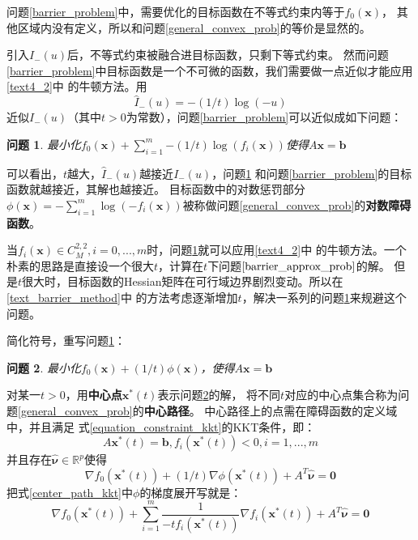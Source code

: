 \documentclass{article}
\newtheorem{problem}{问题}
\begin{document}
问题\ref{barrier_problem}中，需要优化的目标函数在不等式约束内等于$f_0(\bm x)$，
其他区域内没有定义，所以和问题\ref{general_convex_prob}的等价是显然的。

引入$I_-(u)$后，不等式约束被融合进目标函数，只剩下等式约束。
然而问题\ref{barrier_problem}中目标函数是一个不可微的函数，我们需要做一点近似才能应用\ref{text4_2}中
的牛顿方法。用
$$\widehat I_-(u)=-(1/t)\log(-u)$$
近似$I_-(u)$（其中$t>0$为常数），问题\ref{barrier_problem}可以近似成如下问题：
\begin{problem}
    最小化$f_0(\bm x)+\sum_{i=1}^m{-(1/t)\log(f_i(\bm x))}$使得$A\bm x=\bm b$
    \label{barrier_approx_prob}
\end{problem}

可以看出，$t$越大，$\widehat I_-(u)$越接近$I_-(u)$，问题\ref{barrier_approx_prob}
和问题\ref{barrier_problem}的目标函数就越接近，其解也越接近。
目标函数中的对数惩罚部分$\phi(\bm x)=-\sum_{i=1}^m\log (-f_i(\bm x))$被称做问题\ref{general_convex_prob}的\textbf{对数障碍函数}。

当$f_i(\bm x)\in C_M^{2,2},i=0,...,m$时，问题\ref{barrier_approx_prob}就可以应用\ref{text4_2}中
的牛顿方法。一个朴素的思路是直接设一个很大$t$，计算在$t$下问题$\ref{barrier_approx_prob}$的解。
但是$t$很大时，目标函数的Hessian矩阵在可行域边界剧烈变动。所以在\ref{text_barrier_method}中
的方法考虑逐渐增加$t$，解决一系列的问题\ref{barrier_approx_prob}来规避这个问题。

简化符号，重写问题\ref{barrier_approx_prob}：
\begin{problem}
    最小化$f_0(\bm x)+(1/t)\phi(\bm x)$，使得$A\bm x=\bm b$
    \label{barrier_approx_prob_simple}
\end{problem}

对某一$t>0$，用\textbf{中心点}$\bm x^*(t)$表示问题\ref{barrier_approx_prob_simple}的解，
将不同$t$对应的中心点集合称为问题\ref{general_convex_prob}的\textbf{中心路径}。
中心路径上的点需在障碍函数的定义域中，并且满足
式\eqref{equation_constraint_kkt}的KKT条件，即：
$$A\bm x^*(t)=\bm b,f_i(\bm x^*(t))<0,i=1,...,m$$
并且存在$\widehat{\bm \nu}\in \mathbb{R}^p$使得
\begin{equation}\nabla f_0(\bm x^*(t))+(1/t)\nabla\phi(\bm x^*(t))+A^T\widehat{\bm \nu}=\bm 0\label{center_path_kkt}\end{equation}
把式\eqref{center_path_kkt}中$\phi$的梯度展开写就是：
\begin{equation}
    \nabla f_0(\bm x^*(t))+\sum_{i=1}^m{\frac{1}{-tf_i(\bm x^*(t))}\nabla f_i(\bm x^*(t))}+A^T\widehat{\bm \nu}=\bm 0\label{center_path_kkt_2}
\end{equation}
\end{document}
